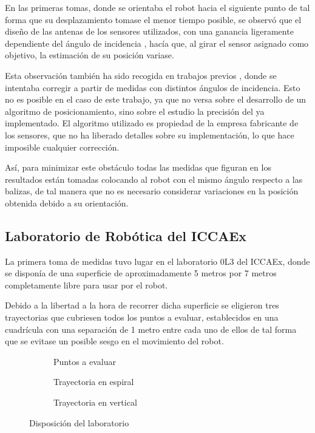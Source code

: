 En las primeras tomas, donde se orientaba el robot hacia el siguiente punto de tal forma que su desplazamiento tomase el menor tiempo posible, se observó que el diseño de las antenas de los sensores utilizados, con una ganancia ligeramente dependiente del ángulo de incidencia \cite{ang}, hacía que, al girar el sensor asignado como objetivo, la estimación de su posición variase.

Esta observación también ha sido recogida en trabajos previos \cite{MSTesis}, donde se intentaba corregir a partir de medidas con distintos ángulos de incidencia.
Esto no es posible en el caso de este trabajo, ya que no versa sobre el desarrollo de un algoritmo de posicionamiento, sino sobre el estudio la precisión del ya implementado.
El algoritmo utilizado es propiedad de la empresa fabricante de los sensores, que no ha liberado detalles sobre su implementación, lo que hace imposible cualquier corrección.

Así, para minimizar este obstáculo todas las medidas que figuran en los resultados están tomadas colocando al robot con el mismo ángulo respecto a las balizas, de tal manera que no es necesario considerar variaciones en la posición obtenida debido a su orientación.

\subsection{Laboratorio de Robótica del ICCAEx}

La primera toma de medidas tuvo lugar en el laboratorio 0L3 del ICCAEx, donde se disponía de una superficie de aproximadamente 5 metros por 7 metros completamente libre para usar por el robot.

Debido a la libertad a la hora de recorrer dicha superficie se eligieron tres trayectorias que cubriesen todos los puntos a evaluar, establecidos en una cuadrícula con una separación de 1 metro entre cada uno de ellos de tal forma que se evitase un posible sesgo en el movimiento del robot.

\begin{figure}[H]
    \begin{subfigure}[b]{.3\textwidth}
      \centering
      \def\svgwidth{0.8\linewidth}
	     
      \caption{Puntos a evaluar}
      \label{fig:puntos}
    \end{subfigure}
    \begin{subfigure}[b]{.3\textwidth}
      \centering
      \def\svgwidth{0.8\linewidth}
	     
      \caption{Trayectoria en espiral}
      \label{fig:espiral}
    \end{subfigure}
    \begin{subfigure}[b]{.3\textwidth}
        \centering
        \def\svgwidth{0.8\linewidth}
	     
        \caption{Trayectoria en vertical}
        \label{fig:vertical}
      \end{subfigure}
    \caption{Disposición del laboratorio}
    \label{fig:laboratorio}
\end{figure}

